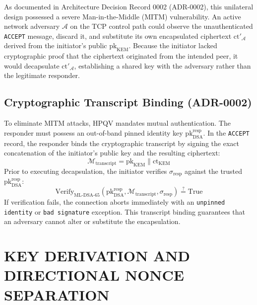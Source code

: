 As documented in Architecture Decision Record 0002 (ADR-0002), this unilateral design possessed a severe Man-in-the-Middle (MITM) vulnerability. An active network adversary $\mathcal{A}$ on the TCP control path could observe the unauthenticated \texttt{ACCEPT} message, discard it, and substitute its own encapsulated ciphertext $\text{ct}'_{\mathcal{A}}$ derived from the initiator's public $\text{pk}_{\text{KEM}}$. Because the initiator lacked cryptographic proof that the ciphertext originated from the intended peer, it would decapsulate $\text{ct}'_{\mathcal{A}}$, establishing a shared key with the adversary rather than the legitimate responder.

\subsection{Cryptographic Transcript Binding (ADR-0002)}
To eliminate MITM attacks, HPQV mandates mutual authentication. The responder must possess an out-of-band pinned identity key $\text{pk}_{\text{DSA}}^{\text{resp}}$. In the \texttt{ACCEPT} record, the responder binds the cryptographic transcript by signing the exact concatenation of the initiator's public key and the resulting ciphertext:
\begin{equation}
    \mathcal{M}_{\text{transcript}} = \text{pk}_{\text{KEM}} \parallel \text{ct}_{\text{KEM}}
\end{equation}
Prior to executing decapsulation, the initiator verifies $\sigma_{\text{resp}}$ against the trusted $\text{pk}_{\text{DSA}}^{\text{resp}}$:
\begin{equation}
    \text{Verify}_{\text{ML-DSA-65}}(\text{pk}_{\text{DSA}}^{\text{resp}}, \mathcal{M}_{\text{transcript}}, \sigma_{\text{resp}}) \stackrel{?}{=} \text{True}
\end{equation}
If verification fails, the connection aborts immediately with an \texttt{unpinned identity} or \texttt{bad signature} exception. This transcript binding guarantees that an adversary cannot alter or substitute the encapsulation.

\section{KEY DERIVATION AND DIRECTIONAL NONCE SEPARATION}

